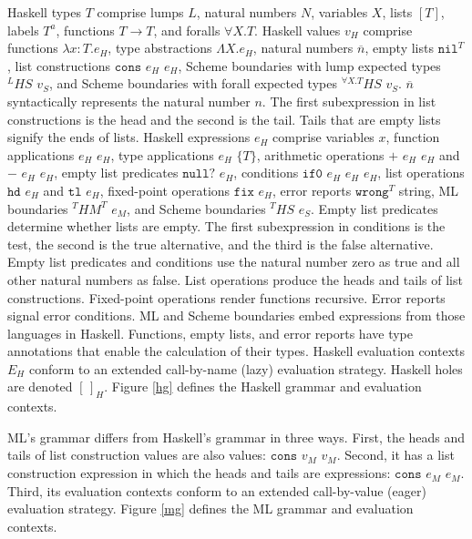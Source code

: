 Haskell types $T$ comprise lumps $L$, natural numbers $N$, variables $X$, lists $[T]$, labels $T^{a}$, functions $T\rightarrow T$, and foralls $\forall X.T$.  Haskell values $v_{H}$ comprise functions $\lambda x:T.e_{H}$, type abstractions $\Lambda X.e_{H}$, natural numbers $\overline{n}$, empty lists $\mathtt{nil}^{T}$, list constructions $\mathtt{cons}$ $e_{H}$ $e_{H}$, Scheme boundaries with lump expected types $^{L}HS$ $v_{S}$, and Scheme boundaries with forall expected types $^{\forall X.T}HS$ $v_{S}$.  $\overline{n}$ syntactically represents the natural number $n$.  The first subexpression in list constructions is the head and the second is the tail.  Tails that are empty lists signify the ends of lists.  Haskell expressions $e_{H}$ comprise variables $x$, function applications $e_{H}$ $e_{H}$, type applications $e_{H}$ $\lbrace T\rbrace$, arithmetic operations $+$ $e_{H}$ $e_{H}$ and $-$ $e_{H}$ $e_{H}$, empty list predicates $\mathtt{null?}$ $e_{H}$, conditions $\mathtt{if0}$ $e_{H}$ $e_{H}$ $e_{H}$, list operations $\mathtt{hd}$ $e_{H}$ and $\mathtt{tl}$ $e_{H}$, fixed-point operations $\mathtt{fix}$ $e_{H}$, error reports $\mathtt{wrong}^{T}$ string, ML boundaries $^{T}HM^{T}$ $e_{M}$, and Scheme boundaries $^{T}HS$ $e_{S}$.  Empty list predicates determine whether lists are empty.  The first subexpression in conditions is the test, the second is the true alternative, and the third is the false alternative.  Empty list predicates and conditions use the natural number zero as true and all other natural numbers as false.  List operations produce the heads and tails of list constructions.  Fixed-point operations render functions recursive.  Error reports signal error conditions.  ML and Scheme boundaries embed expressions from those languages in Haskell.  Functions, empty lists, and error reports have type annotations that enable the calculation of their types.  Haskell evaluation contexts $E_{H}$ conform to an extended call-by-name (lazy) evaluation strategy.  Haskell holes are denoted $[\,]_{H}$.  Figure \ref{hg} defines the Haskell grammar and evaluation contexts.

ML's grammar differs from Haskell's grammar in three ways.  First, the heads and tails of list construction values are also values: $\mathtt{cons}$ $v_{M}$ $v_{M}$. Second, it has a list construction expression in which the heads and tails are expressions: $\mathtt{cons}$ $e_{M}$ $e_{M}$.  Third, its evaluation contexts conform to an extended call-by-value (eager) evaluation strategy.  Figure \ref{mg} defines the ML grammar and evaluation contexts.

